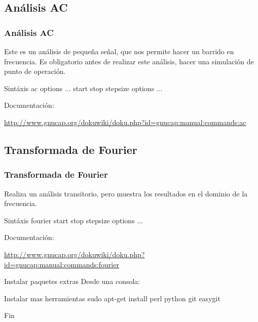 \documentclass{beamer}
\begin{document}
\subsection{Análisis AC}
\begin{frame}
\frametitle{Análisis AC}
Este es un análisis de pequeña señal, que nos permite hacer un barrido en frecuencia. Es obligatorio antes de realizar este análisis, hacer una simulación de punto de operación.

\begin{exampleblock}{Sintáxis}
  ac {options ...} start stop stepsize {options ...} 
\end{exampleblock}


Documentación:
  \begin{tiny}
    \url{http://www.gnucap.org/dokuwiki/doku.php?id=gnucap:manual:commands:ac}
  \end{tiny}


\end{frame}
\subsection{Transformada de Fourier}
\begin{frame}
\frametitle{Transformada de Fourier}
Realiza un análisis transitorio, pero muestra los resultados en el dominio de la frecuencia.
\begin{exampleblock}{Sintáxis}
  fourier start stop stepsize {options ...} 
\end{exampleblock}


Documentación:
  \begin{tiny}
    \url{http://www.gnucap.org/dokuwiki/doku.php?id=gnucap:manual:commands:fourier}
  \end{tiny}

\end{frame}
\begin{frame}{Instalar paquetes extras}
  Desde una consola:
  \begin{exampleblock}{Instalar mas herramientas}
    sudo apt-get install perl python git easygit
  \end{exampleblock}
  \end{frame}

\begin{frame}
\Huge{\centerline{Fin}}
\end{frame}

\end{document}
